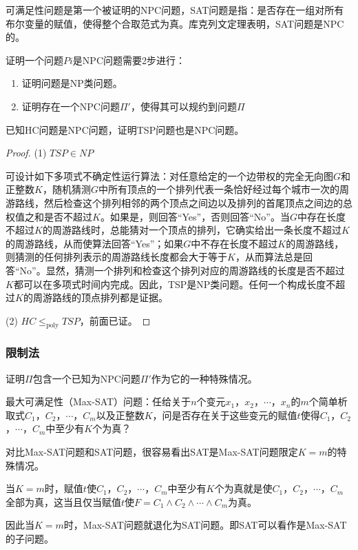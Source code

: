 \documentclass[./../main.tex]{subfiles}
\begin{document}
可满足性问题是第一个被证明的NPC问题，SAT问题是指：是否存在一组对所有布尔变量的赋值，使得整个合取范式为真。库克列文定理表明，SAT问题是NPC的。

证明一个问题$Pi$是NPC问题需要2步进行：
\begin{enumerate}
    \item 证明问题是NP类问题。
    \item 证明存在一个NPC问题$\Pi'$，使得其可以规约到问题$\Pi$
\end{enumerate}

已知HC问题是NPC问题，证明TSP问题也是NPC问题。
\begin{proof}
    (1) $TSP \in NP$

    可设计如下多项式不确定性运行算法：对任意给定的一个边带权的完全无向图$G$和正整数$K$，随机猜测$G$中所有顶点的一个排列代表一条恰好经过每个城市一次的周游路线，然后检查这个排列相邻的两个顶点之间边以及排列的首尾顶点之间边的总权值之和是否不超过$K$。如果是，则回答“Yes”，否则回答“No”。当$G$中存在长度不超过$K$的周游路线时，总能猜对一个顶点的排列，它确实给出一条长度不超过$K$的周游路线，从而使算法回答“Yes”；如果$G$中不存在长度不超过$K$的周游路线，则猜测的任何排列表示的周游路线长度都会大于等于$K$，从而算法总是回答“No”。显然，猜测一个排列和检查这个排列对应的周游路线的长度是否不超过$K$都可以在多项式时间内完成。因此，TSP是NP类问题。任何一个构成长度不超过$K$的周游路线的顶点排列都是证据。

    (2) $HC \leq_{\text{poly}} TSP$，前面已证。
\end{proof}


\subsubsection{限制法}
证明$\Pi$包含一个已知为NPC问题$\Pi'$作为它的一种特殊情况。

最大可满足性（Max-SAT）问题：任给关于$n$个变元$x_{1}$，$x_{2}$，$\cdots$，$x_{n}$的$m$个简单析取式$C_{1}$，$C_{2}$，$\cdots$，$C_{m}$以及正整数$K$，问是否存在关于这些变元的赋值$t$使得$C_{1}$，$C_{2}$，$\cdots$，$C_{m}$中至少有$K$个为真？

对比Max-SAT问题和SAT问题，很容易看出SAT是Max-SAT问题限定$K=m$的特殊情况。

当$K=m$时，赋值$t$使$C_{1}$，$C_{2}$，$\cdots$，$C_{m}$中至少有$K$个为真就是使$C_{1}$，$C_{2}$，$\cdots$，$C_{m}$全部为真，这当且仅当赋值$t$使$F=C_{1}\wedge C_{2}\wedge\cdots\wedge C_{m}$为真。

因此当$K=m$时，Max-SAT问题就退化为SAT问题。即SAT可以看作是Max-SAT的子问题。
\end{document}

